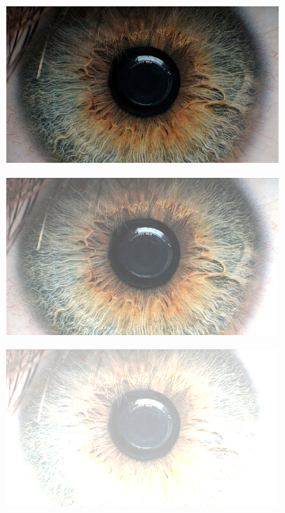 \documentclass{article}
\begin{document}
\begin{figure}[h]
\centering
\begin{subfigure}{.3\textwidth}
  \centering
  \includegraphics[width=0.97\linewidth]{_Figures/sample_1.jpg}
  \caption{}
  \label{fig:brigth_raw_1}
\end{subfigure}%
\begin{subfigure}{.3\textwidth}
  \centering
  \includegraphics[width=0.97\linewidth]{_Figures/sample_1_brightness_low.png}
  \caption{}
  \label{fig:brigth_low_1}
\end{subfigure}
\begin{subfigure}{.3\textwidth}
  \centering
  \includegraphics[width=0.97\linewidth]{_Figures/sample_1_brightness_high.png}
  \caption{}
    \label{fig:brigth_high_1}
\end{subfigure}%


\end{figure}
\end{document}

